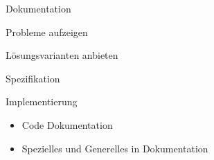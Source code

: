 \begin{frame}[t]{Dokumentation}
  \begin{bigitemize}[<+->]{3mm}
		\item Probleme aufzeigen
		\item Lösungsvarianten anbieten
		\item Spezifikation
		\item Implementierung
		\begin{itemize}
			\item Code Dokumentation
			\item Spezielles und Generelles in Dokumentation
		\end{itemize}
	\end{bigitemize}
\end{frame}
